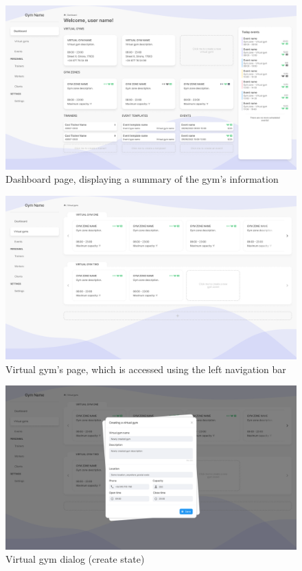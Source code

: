 \documentclass[a4paper, 12pt, oneside]{book}
\begin{document}
\begin{figure}[H]
	\centering
	\includegraphics[width=\textwidth]{assets/ui/Dashboard.png}
	\caption{Dashboard page, displaying a summary of the gym's information}
\end{figure}
\begin{figure}[H]
	\centering
	\includegraphics[width=\textwidth]{assets/ui/VirtualGyms.png}
	\caption{Virtual gym's page, which is accessed using the left navigation bar}
\end{figure}
\begin{figure}[H]
	\centering
	\includegraphics[width=\textwidth]{assets/ui/CreateVirtualGym.png}
	\caption{Virtual gym dialog (create state)}
\end{figure}
\end{document}
